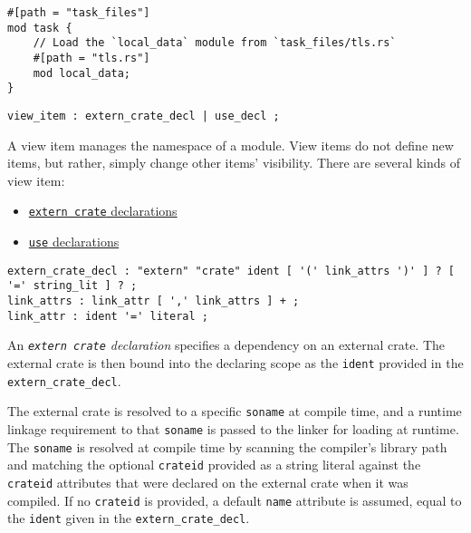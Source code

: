 \documentclass[]{article}
\begin{document}
\begin{verbatim}
#[path = "task_files"]
mod task {
    // Load the `local_data` module from `task_files/tls.rs`
    #[path = "tls.rs"]
    mod local_data;
}
\end{verbatim}


\begin{verbatim}
view_item : extern_crate_decl | use_decl ;
\end{verbatim}

A view item manages the namespace of a module. View items do not define
new items, but rather, simply change other items' visibility. There are
several kinds of view item:

\begin{itemize}
\itemsep1pt\parskip0pt
\item
  \hyperref[extern-crate-declarations]{\texttt{extern crate}
  declarations}
\item
  \hyperref[use-declarations]{\texttt{use} declarations}
\end{itemize}


\begin{verbatim}
extern_crate_decl : "extern" "crate" ident [ '(' link_attrs ')' ] ? [ '=' string_lit ] ? ;
link_attrs : link_attr [ ',' link_attrs ] + ;
link_attr : ident '=' literal ;
\end{verbatim}

An \emph{\texttt{extern crate} declaration} specifies a dependency on an
external crate. The external crate is then bound into the declaring
scope as the \texttt{ident} provided in the
\texttt{extern\_crate\_decl}.

The external crate is resolved to a specific \texttt{soname} at compile
time, and a runtime linkage requirement to that \texttt{soname} is
passed to the linker for loading at runtime. The \texttt{soname} is
resolved at compile time by scanning the compiler's library path and
matching the optional \texttt{crateid} provided as a string literal
against the \texttt{crateid} attributes that were declared on the
external crate when it was compiled. If no \texttt{crateid} is provided,
a default \texttt{name} attribute is assumed, equal to the
\texttt{ident} given in the \texttt{extern\_crate\_decl}.
\end{document}
